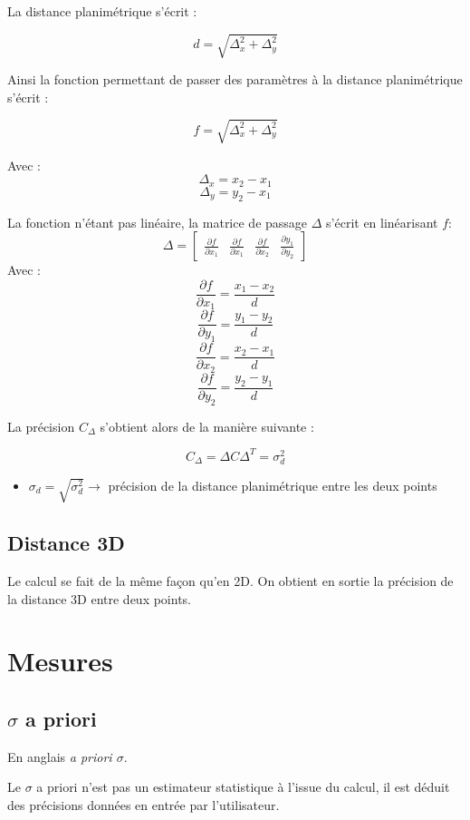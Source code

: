 \documentclass[french]{report}
\begin{document}
La distance planimétrique s'écrit :

$$d=\sqrt{\Delta_{x}^2+\Delta_{y}^2}$$

Ainsi la fonction permettant de passer des paramètres à la distance planimétrique s'écrit :

$$f=\sqrt{\Delta_{x}^2+\Delta_{y}^2}$$

Avec :
$$\Delta_{x}=x_2-x_1$$
$$\Delta_{y}=y_2-x_1$$

La fonction n'étant pas linéaire, la matrice de passage $\Delta$ s'écrit en linéarisant $f$:
$$\Delta=\begin{bmatrix}\frac{\partial f}{\partial x_1} & \frac{\partial f}{\partial x_1} & \frac{\partial f}{\partial x_2} & \frac{\partial y_1}{\partial y_2}\end{bmatrix}$$
Avec :
$$\frac{\partial f}{\partial x_1}=\frac{x_1-x_2}{d}$$
$$\frac{\partial f}{\partial y_1}=\frac{y_1-y_2}{d}$$
$$\frac{\partial f}{\partial x_2}=\frac{x_2-x_1}{d}$$
$$\frac{\partial f}{\partial y_2}=\frac{y_2-y_1}{d}$$

La précision $C_{\Delta}$ s'obtient alors de la manière suivante :

$$C_{\Delta}=\Delta C \Delta^T=\sigma_{d}^2$$

\begin{itemize}
\item $\sigma_{d}=\sqrt{\sigma_{d}^2} \rightarrow $ précision de la distance planimétrique entre les deux points
\end{itemize}

\subsection{Distance 3D}

Le calcul se fait de la même façon qu'en 2D. On obtient en sortie la précision de la distance 3D entre deux points.

\section{Mesures}

\subsection{$\sigma$ a priori}

En anglais \textit{a priori $\sigma$}.

Le $\sigma$ a priori n'est pas un estimateur statistique à l'issue du calcul, il est déduit des précisions données en entrée par l'utilisateur.
\end{document}
